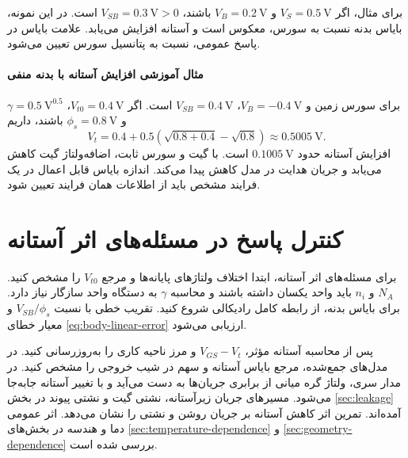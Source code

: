 برای مثال، اگر \(V_S=\qty{0.5}{\volt}\) و
\(V_B=\qty{0.2}{\volt}\) باشند، \(V_{SB}=\qty{0.3}{\volt}>0\) است.
در این نمونه، بایاس بدنه نسبت به سورس، معکوس است و آستانه افزایش
می‌یابد. علامت بایاس در پاسخ عمومی، نسبت به پتانسیل سورس تعیین می‌شود.

\paragraph*{مثال آموزشی افزایش آستانه با بدنه منفی}
برای سورس زمین و \(V_B=-\qty{0.4}{\volt}\)،
\(V_{SB}=\qty{0.4}{\volt}\) است. اگر
\(V_{t0}=\qty{0.4}{\volt}\)،
\(\gamma=\qty{0.5}{\volt\tothe{0.5}}\) و
\(\phi_s=\qty{0.8}{\volt}\) باشند، داریم
\begin{equation*}
 V_t=0.4+0.5\left(\sqrt{0.8+0.4}-\sqrt{0.8}\right)
 \approx\qty{0.5005}{\volt}.
\end{equation*}
افزایش آستانه حدود \(\qty{0.1005}{\volt}\) است.
با گیت و سورس ثابت، اضافه‌ولتاژ گیت کاهش می‌یابد و جریان هدایت
در مدل کاهش پیدا می‌کند. اندازه بایاس قابل اعمال در یک فرایند مشخص
باید از اطلاعات همان فرایند تعیین شود.

\section*{کنترل پاسخ در مسئله‌های اثر آستانه}
برای مسئله‌های اثر آستانه، ابتدا اختلاف ولتاژهای پایانه‌ها و مرجع
\(V_{t0}\) را مشخص کنید. \(N_A\) و \(n_i\) باید واحد یکسان داشته
باشند و محاسبه \(\gamma\) به دستگاه واحد سازگار نیاز دارد.
برای بایاس بدنه، از رابطه کامل رادیکالی شروع کنید. تقریب خطی با
نسبت \(V_{SB}/\phi_s\) و معیار خطای
\eqref{eq:body-linear-error} ارزیابی می‌شود.

پس از محاسبه آستانه مؤثر، \(V_{GS}-V_t\) و مرز ناحیه کاری را
به‌روزرسانی کنید. در مدل‌های جمع‌شده، مرجع بایاس آستانه و سهم
 در شیب خروجی را مشخص کنید. در مدار سری، ولتاژ گره میانی
از برابری جریان‌ها به دست می‌آید و با تغییر آستانه جابه‌جا می‌شود.
مسیرهای جریان زیرآستانه، نشتی گیت و نشتی پیوند در بخش
\ref{sec:leakage} آمده‌اند. تمرین  اثر کاهش آستانه بر جریان
روشن و نشتی را نشان می‌دهد. اثر عمومی دما و هندسه در بخش‌های
\ref{sec:temperature-dependence} و \ref{sec:geometry-dependence} بررسی شده است.
